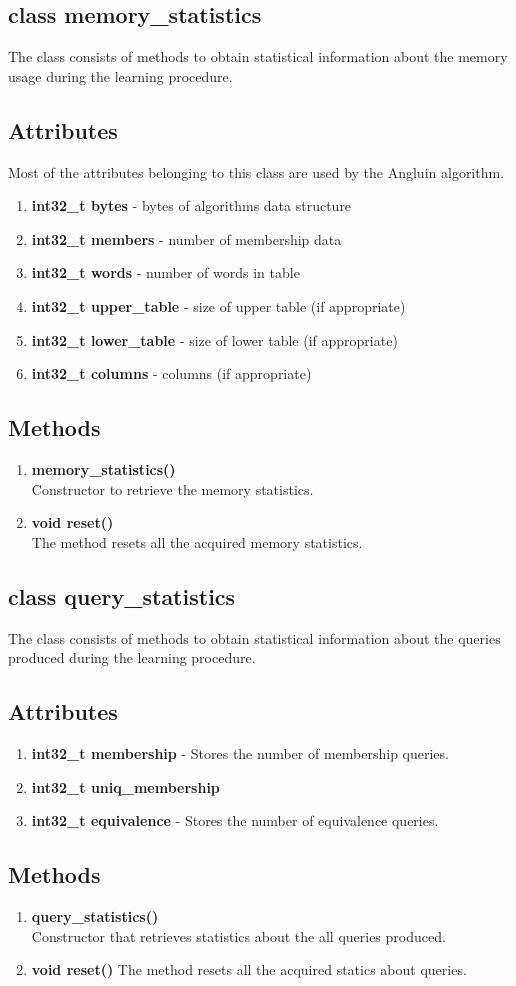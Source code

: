 \subsection{class memory\_statistics}
The class consists of methods to obtain statistical information about the memory usage during the learning procedure. 
\subsection*{Attributes}
Most of the attributes belonging to this class are used by the Angluin algorithm.
\begin{enumerate}
 \item \textbf{int32\_t bytes} - bytes of algorithms data structure
 \item \textbf{int32\_t members} - number of membership data
 \item \textbf{int32\_t words} - number of words in table
 \item \textbf{int32\_t upper\_table} - size of upper table (if appropriate)
 \item \textbf{int32\_t lower\_table} - size of lower table (if appropriate)
 \item \textbf{int32\_t columns} - columns (if appropriate)
\end{enumerate}
\subsection*{Methods}
\begin{enumerate}
 \item \textbf{memory\_statistics()} \\
	Constructor to retrieve the memory statistics.
 \item \textbf{void reset()} \\
        The method resets all the acquired memory statistics.
\end{enumerate}

\subsection{class query\_statistics}
The class consists of methods to obtain statistical information about the queries produced during the learning procedure.
\subsection*{Attributes}
\begin{enumerate}
 \item \textbf{int32\_t membership} - Stores the number of membership queries.
 \item \textbf{int32\_t uniq\_membership}
 \item \textbf{int32\_t equivalence} - Stores the number of equivalence queries.
\end{enumerate}
\subsection*{Methods}
\begin{enumerate}
 \item \textbf{query\_statistics()} \\
	Constructor that retrieves statistics about the all queries produced.
 \item \textbf{void reset()}
	The method resets all the acquired statics about queries.
\end{enumerate}


